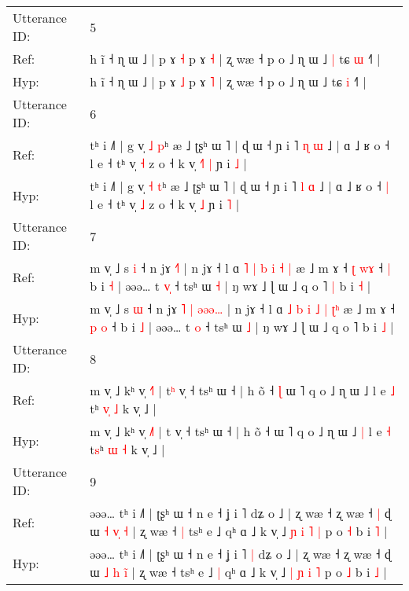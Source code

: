 \documentclass[10pt]{article}
\DeclareRobustCommand{\hl}[1]{{\textcolor{red}{#1}}}
\begin{document}
\begin{longtable}{ll}
 \\
\midrule
Utterance ID: & 5 \\
Ref: & h ĩ ˧ ɳ ɯ ˩ | p ɤ \hl{˧} p ɤ \hl{˧} | ʐ wæ ˧ p o ˩ ɳ ɯ ˩\hl{ }\hl{|} tɕ \hl{ɯ} ˧˥ |
 \\
Hyp: & h ĩ ˧ ɳ ɯ ˩ | p ɤ \hl{˩} p ɤ \hl{˥} | ʐ wæ ˧ p o ˩ ɳ ɯ ˩\hl{}\hl{} tɕ \hl{i} ˧˥ |
 \\
\midrule
Utterance ID: & 6 \\
Ref: & tʰ i ˩˥ | g v̩ \hl{˩} \hl{p}ʰ æ ˩ ʈʂʰ ɯ ˥ | ɖ ɯ ˧ ɲ i ˥ \hl{ɳ} \hl{ɯ} ˩ | ɑ ˩ ʁ o ˧\hl{}\hl{} l e ˧ tʰ v̩ \hl{˧} z o ˧ k v̩\hl{ }\hl{˧}\hl{˥} \hl{|} ɲ i \hl{˩} |
 \\
Hyp: & tʰ i ˩˥ | g v̩ \hl{˧} \hl{t}ʰ æ ˩ ʈʂʰ ɯ ˥ | ɖ ɯ ˧ ɲ i ˥ \hl{l} \hl{ɑ} ˩ | ɑ ˩ ʁ o ˧\hl{ }\hl{|} l e ˧ tʰ v̩ \hl{˩} z o ˧ k v̩\hl{}\hl{}\hl{} \hl{˩} ɲ i \hl{˥} |
 \\
\midrule
Utterance ID: & 7 \\
Ref: & m v̩ ˩ s \hl{i} ˧ n jɤ\hl{}\hl{}\hl{}\hl{} \hl{}\hl{}\hl{˧}\hl{˥} | n jɤ ˧ l ɑ \hl{˥} \hl{|} \hl{b} \hl{i} \hl{˧} \hl{}\hl{|} æ ˩ m ɤ ˧ \hl{ʈ} \hl{w}\hl{ɤ} ˧\hl{ }\hl{|} b i \hl{˧} | əəə… t \hl{v}\hl{̩} ˧ tsʰ ɯ \hl{˧} | ŋ wɤ ˩ ɭ ɯ ˩ q o ˥\hl{ }\hl{|} b i \hl{˧} |
 \\
Hyp: & m v̩ ˩ s \hl{ɯ} ˧ n jɤ\hl{ }\hl{˥}\hl{ }\hl{|} \hl{ə}\hl{ə}\hl{ə}\hl{…} | n jɤ ˧ l ɑ \hl{˩} \hl{b} \hl{i} \hl{˩} \hl{|} \hl{ʈ}\hl{ʰ} æ ˩ m ɤ ˧ \hl{p} \hl{}\hl{o} ˧\hl{}\hl{} b i \hl{˩} | əəə… t \hl{}\hl{o} ˧ tsʰ ɯ \hl{˩} | ŋ wɤ ˩ ɭ ɯ ˩ q o ˥\hl{}\hl{} b i \hl{˩} |
 \\
\midrule
Utterance ID: & 8 \\
Ref: & m v̩ ˩ kʰ v̩ \hl{˧}˥ | t\hl{ʰ} v̩ ˧ tsʰ ɯ ˧ | h õ ˧\hl{ }\hl{ɭ} ɯ ˥ q o ˩ ɳ ɯ ˩\hl{}\hl{} l e \hl{˩} t\hl{}ʰ \hl{v}\hl{̩} \hl{˩} k v̩ ˩ |
 \\
Hyp: & m v̩ ˩ kʰ v̩ \hl{˩}˥ | t\hl{} v̩ ˧ tsʰ ɯ ˧ | h õ ˧\hl{}\hl{} ɯ ˥ q o ˩ ɳ ɯ ˩\hl{ }\hl{|} l e \hl{˧} t\hl{s}ʰ \hl{}\hl{ɯ} \hl{˧} k v̩ ˩ |
 \\
\midrule
Utterance ID: & 9 \\
Ref: & əəə… tʰ i ˩˥ | ʈʂʰ ɯ ˧ n e ˧ ʝ i ˥\hl{}\hl{} dʑ o ˩ | ʐ wæ ˧ ʐ wæ ˧\hl{ }\hl{|} ɖ ɯ \hl{˧} \hl{v}\hl{̩}\hl{ }\hl{˧} | ʐ wæ ˧\hl{ }\hl{|} tsʰ e ˩\hl{}\hl{} qʰ ɑ ˩ k v̩ ˩ \hl{ɲ} \hl{i} \hl{˥} \hl{|} p o \hl{˧} b i \hl{˥} |
 \\
Hyp: & əəə… tʰ i ˩˥ | ʈʂʰ ɯ ˧ n e ˧ ʝ i ˥\hl{ }\hl{|} dʑ o ˩ | ʐ wæ ˧ ʐ wæ ˧\hl{}\hl{} ɖ ɯ \hl{˩} \hl{h}\hl{ }\hl{i}\hl{̃} | ʐ wæ ˧\hl{}\hl{} tsʰ e ˩\hl{ }\hl{|} qʰ ɑ ˩ k v̩ ˩ \hl{|} \hl{ɲ} \hl{i} \hl{˥} p o \hl{˩} b i \hl{˩} |
 \\

\end{longtable}
\end{document}
